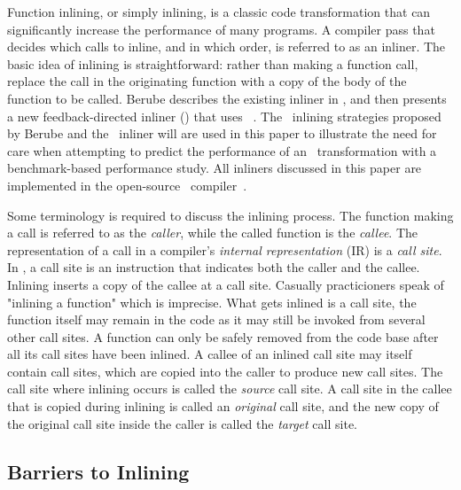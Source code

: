 
Function inlining, or simply inlining, is a classic code transformation that can significantly increase the performance of many programs.  A compiler pass that decides which calls to inline, and in which order, is referred to as an inliner.  The basic idea of inlining is straightforward: rather than making a function call, replace the call in the originating function with a copy of the body of the function to be called.  Berube  describes the existing inliner in \llvm, and then presents a new feedback-directed inliner (\FDI) that uses \CP~\cite{BerubePhD}. The \FDI\ inlining strategies proposed by Berube and the \llvm\ inliner will are used in this paper to illustrate the need for care when attempting to predict the performance of an \FDO\  transformation with a benchmark-based performance study.
All inliners discussed in this paper are implemented in the open-source \llvm\ compiler~\cite{LattnerAdveCGO04}.

Some terminology is required to discuss the inlining process.  The function making a call is referred to as the {\it caller}, while the called function is the {\it callee}.  The representation of a call in a compiler's {\it internal representation} (IR) is a {\it call site}. In \llvm, a call site is an instruction that indicates both the caller and the callee.  Inlining inserts a copy of the callee at a call site. Casually practicioners speak of "inlining a function" which is imprecise. What gets inlined is a call site, the function itself may remain in the code as it may still be invoked from several other call sites. A function can only be safely removed from the code base after all its call sites have been inlined. A callee of an inlined call site may itself contain call sites, which are copied into the caller to produce new call sites.  The call site where inlining occurs is called the {\it source} call site.  A call site in the callee that is copied during inlining is called an {\it original} call site, and the new copy of the original call site inside the caller is called the {\it target} call site.

\subsection{Barriers to Inlining}

